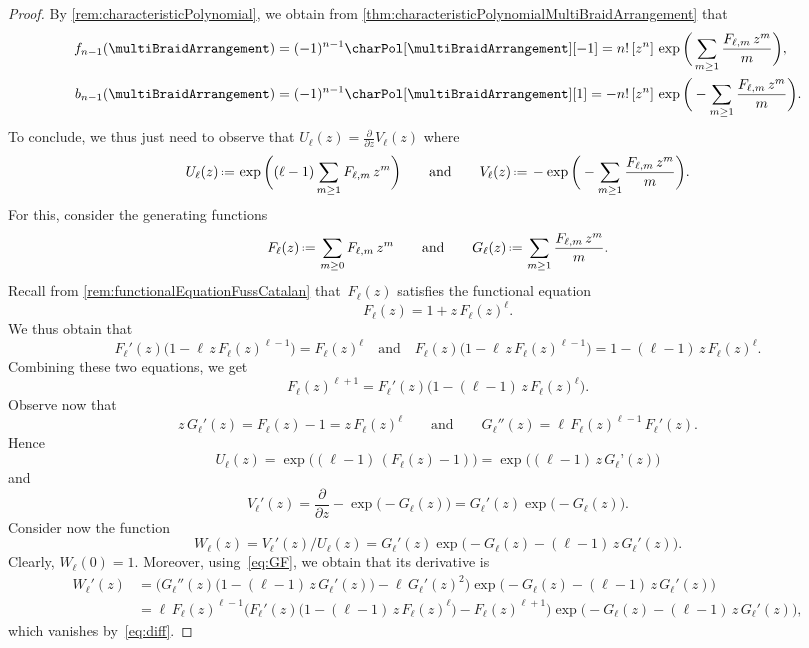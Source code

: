 \documentclass{amsart}
\newcommand{\vincent}[1]{\todo[color=blue!30]{\rm #1 \\ \hfill --- V.}}
\theoremstyle{definition}
\newcommand{\eqdef}{\mbox{\,\raisebox{0.2ex}{\scriptsize\ensuremath{\mathrm:}}\ensuremath{=}\,}} %
\begin{document}
\begin{proof}
By \cref{rem:characteristicPolynomial}, we obtain from \cref{thm:characteristicPolynomialMultiBraidArrangement} that
\begin{align*}
f_{n-1}(\multiBraidArrangement) & = (-1)^{n-1} \charPol[\multiBraidArrangement][-1] = n! \, [z^n]  \, \exp \bigg( \sum_{m \ge 1} \frac{F_{\ell,m} \, z^m}{m} \bigg), \\
b_{n-1}(\multiBraidArrangement) & = (-1)^{n-1} \charPol[\multiBraidArrangement][1] = - n! \, [z^n]  \, \exp \bigg( - \sum_{m \ge 1} \frac{F_{\ell,m} \, z^m}{m} \bigg).
\end{align*}
To conclude, we thus just need to observe that
\(
U_\ell(z) = \frac{\partial}{\partial z} V_\ell(z)
\)
where
\[
U_\ell(z) \eqdef \exp \bigg( (\ell-1) \sum_{m \ge 1} F_{\ell,m} \, z^m \bigg)
\qquad\text{and}\qquad
V_\ell(z) \eqdef - \exp \bigg( - \sum_{m \ge 1} \frac{F_{\ell,m} \, z^m}{m} \bigg).
\]
For this, consider the generating functions
\[
F_\ell(z) \eqdef \sum_{m \ge 0} F_{\ell,m} \, z^m
\qquad\text{and}\qquad
G_\ell(z) \eqdef \sum_{m \ge 1} \frac{F_{\ell,m} \, z^m}{m}.
\]
Recall from \cref{rem:functionalEquationFussCatalan} that~$F_\ell(z)$ satisfies the functional equation
\[
F_\ell(z) = 1 + z \, F_\ell(z)^\ell.
\]
We thus obtain that
\[
F_\ell'(z) \big( 1 - \ell \, z \, F_\ell(z)^{\ell-1} \big) = F_\ell(z)^\ell
\quad\text{and}\quad
F_\ell(z) \big( 1 - \ell \, z \, F_\ell(z)^{\ell-1} \big) = 1 - (\ell-1) \, z \, F_\ell(z)^\ell.
\]
Combining these two equations, we get
\begin{equation}
\label{eq:diff}
F_\ell(z)^{\ell+1} = F_\ell'(z) \big( 1 - (\ell-1) \, z \, F_\ell(z)^\ell \big).
\end{equation}
Observe now that
\begin{equation}
\label{eq:GF}
z \, G_\ell'(z) = F_\ell(z) - 1 = z \, F_\ell(z)^\ell
\qquad\text{and}\qquad
G_\ell''(z) = \ell \, F_\ell(z)^{\ell-1} \, F_\ell'(z).
\end{equation}
Hence
\[
U_\ell(z) = \exp \big( (\ell-1) \, (F_\ell(z) - 1) \big) = \exp \big( (\ell-1) \, z \, G_\ell’(z) \big)
\]
and
\[
V_\ell'(z) = \frac{\partial}{\partial z}  - \exp \big( \! - G_\ell(z) \big) = G_\ell'(z) \exp \big( -G_\ell(z) \big).
\]
Consider now the function
\[
W_\ell(z) = V_\ell'(z) / U_\ell(z) = G_\ell'(z) \exp \big( \! - G_\ell(z) - (\ell-1) \, z \, G_\ell'(z) \big).
\]
Clearly, $W_\ell(0) = 1$.
Moreover, using~\eqref{eq:GF}, we obtain that its derivative is
\begin{align*}
W_\ell'(z)
& = \Big( G_\ell''(z) \big(1 - (\ell-1) \, z \, G_\ell'(z) \big) - \ell \, G_\ell'(z)^2 \Big) \exp \big( \! - G_\ell(z) - (\ell-1) \, z \, G_\ell'(z) \big) \\
& = \ell \, F_\ell(z)^{\ell-1} \Big( F_\ell'(z) \big( 1 - (\ell-1) \, z \, F_\ell(z)^\ell \big) - F_\ell(z)^{\ell+1} \Big) \exp \big( \! - G_\ell(z) - (\ell-1) \, z \, G_\ell'(z) \big),
\end{align*}
which vanishes by~\eqref{eq:diff}.
\end{proof}
\end{document}
